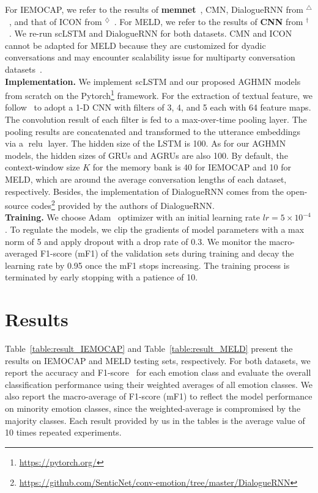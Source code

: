 \documentclass[letterpaper]{article} %
\DeclareMathOperator{\relu}{relu}
\begin{document}
For IEMOCAP, we refer to the results of \textbf{memnet}~\cite{DBLP:conf/nips/SukhbaatarSWF15}, CMN, DialogueRNN from $^\triangle$~\cite{DBLP:conf/aaai/MajumderPHMGC19}, and that of ICON from $^\diamondsuit$~\cite{DBLP:conf/emnlp/HazarikaPMCZ18}. For MELD, we refer to the results of \textbf{CNN} from $^\dagger$~\cite{DBLP:journals/access/PoriaMMH19}. We re-run scLSTM and DialogueRNN for both datasets.
CMN and ICON cannot be adapted for MELD because they are customized for dyadic conversations and may encounter scalability issue for multiparty conversation datasets~\cite{DBLP:journals/access/PoriaMMH19}.
\\[1ex]
\noindent\textbf{Implementation.}
We implement scLSTM and our proposed AGHMN models from scratch on the Pytorch\footnote{\url{https://pytorch.org/}} framework. For the extraction of textual feature, we follow~\cite{DBLP:conf/emnlp/HazarikaPMCZ18} to adopt a 1-D CNN with filters of 3, 4, and 5 each with 64 feature maps. The convolution result of each filter is fed to a max-over-time pooling layer. The pooling results are concatenated and transformed to the utterance embeddings via a $\relu$ layer. The hidden size of the LSTM is 100. As for our AGHMN models, the hidden sizes of GRUs and AGRUs are also 100. By default, the context-window size $K$ for the memory bank is 40 for IEMOCAP and 10 for MELD, which are around the average conversation lengths of each dataset, respectively. Besides, the implementation of DialogueRNN comes from the open-source codes\footnote{\url{https://github.com/SenticNet/conv-emotion/tree/master/DialogueRNN}} provided by the authors of DialogueRNN.
\\[1ex]
\noindent\textbf{Training.}
We choose Adam~\cite{DBLP:journals/corr/KingmaB14} optimizer with an initial learning rate $lr = 5\times 10^{-4}$. To regulate the models, we clip the gradients of model parameters with a max norm of 5 and apply dropout with a drop rate of 0.3. We monitor the macro-averaged F1-score (mF1) of the validation sets during training and decay the learning rate by 0.95 once the mF1 stops increasing. The training process is terminated by early stopping with a patience of 10.


\section{Results}

Table~\ref{table:result_IEMOCAP} and Table~\ref{table:result_MELD} present the results on IEMOCAP and MELD testing sets, respectively. For both datasets, we report the accuracy and F1-score~\cite{DBLP:conf/acl/TongZJM17} for each emotion class and evaluate the overall classification performance using their weighted averages of all emotion classes. We also report the macro-average of F1-score (mF1) to reflect the model performance on minority emotion classes, since the weighted-average is compromised by the majority classes. Each result provided by us in the tables is the average value of 10 times repeated experiments.
\end{document}
